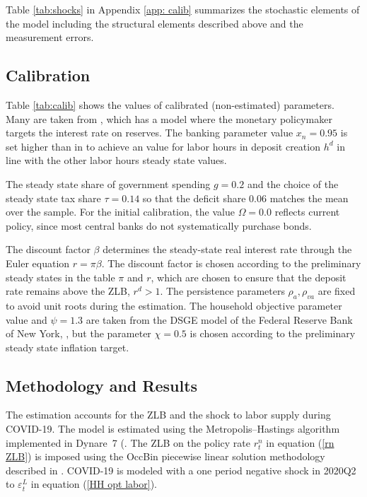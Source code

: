 \documentclass[]{article}
\begin{document}
Table \ref{tab:shocks} in Appendix \ref{app: calib} summarizes the stochastic elements of the model including the structural elements described above and the measurement errors.

\subsection{Calibration}

Table \ref{tab:calib} shows the values of calibrated (non-estimated) parameters. Many are taken from \textcite{ireland2014macroeconomics}, which has a model where the monetary policymaker targets the interest rate on reserves. The banking parameter value $x_{n}=0.95$ is set higher than in \textcite{ireland2014macroeconomics} to achieve an value for labor hours in deposit creation $h^{d}$ in line with the other labor hours steady state values. 

The steady state share of government spending $g=0.2$ and the choice of the steady state tax share $\tau=0.14$ so that the deficit share 0.06 matches the mean over the sample. For the initial calibration, the value $\Omega=0.0$ reflects current policy, since most central banks do not systematically purchase bonds. 

The discount factor $\beta$ determines the steady-state real interest rate through the Euler equation $r=\pi \beta$.
The discount factor is chosen according to the preliminary steady states in the table $\pi$ and $r$, which are chosen to ensure that the deposit rate remains above the ZLB, $r^{d}>1$. The persistence parameters $\rho_{a},\rho_{va}$ are fixed to avoid unit roots during the estimation. The household objective parameter value and $\psi=1.3$ are taken from the DSGE model of the Federal Reserve Bank of New York, \textcite{frbny_dsge_model}, but the parameter $\chi=0.5$ is chosen according to the preliminary steady state inflation target.

\subsection{Methodology and Results}

The estimation accounts for the ZLB and the shock to labor supply during COVID-19. The model is estimated using the Metropolis--Hastings algorithm implemented in Dynare~7 (\textcite{adjemian2011dynare}. The ZLB on the policy rate $r^{n}_{t}$ in equation (\ref{rn ZLB}) is imposed using the OccBin piecewise linear solution methodology described in \textcite{GuerrieriIacoviello2015}. COVID-19 is modeled with a one period negative shock in 2020Q2 to $\varepsilon^L_t$ in equation (\ref{HH opt labor}).
\end{document}
